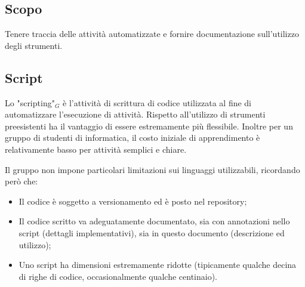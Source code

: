 \subsection{Scopo}
Tenere traccia delle attività automatizzate e fornire documentazione sull'utilizzo degli strumenti.

\subsection{Script}
Lo "scripting"$_G$ è l'attività di scrittura di codice utilizzata al fine di automatizzare l'esecuzione di attività. Rispetto all'utilizzo di strumenti preesistenti ha il vantaggio di essere estremamente più flessibile. Inoltre per un gruppo di studenti di informatica, il costo iniziale di apprendimento è relativamente basso per attività semplici e chiare.

Il gruppo non impone particolari limitazioni sui linguaggi utilizzabili, ricordando però che:
\begin{itemize}
    \item Il codice è soggetto a versionamento ed è posto nel repository;
    \item Il codice scritto va adeguatamente documentato, sia con annotazioni nello script (dettagli implementativi), sia in questo documento (descrizione ed utilizzo);
    \item Uno script ha dimensioni estremamente ridotte (tipicamente qualche decina di righe di codice, occasionalmente qualche centinaio).
\end{itemize}


